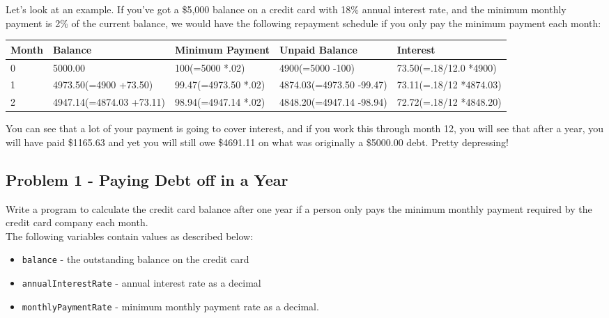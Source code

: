 \documentclass{article}
\begin{document}
Let's look at an example. If you've got a \$5,000 balance on a credit card with
18\% annual interest rate, and the minimum monthly payment is 2\% of the current
balance, we would have the following repayment schedule if you only pay the
minimum payment each month:

\begin{table}[H]
  \centering

  \begin{tabular}{ | m{1cm} | m{3cm} | m{3cm} | m{3cm} | m{3cm} | }
    \hline
    Month & Balance & Minimum Payment & Unpaid Balance & Interest \\
    \hline
    0   & 5000.00 & 100(=5000 *.02) & 4900(=5000 -100) & 73.50(=.18/12.0 *4900)\\
    \hline
    1 & 4973.50(=4900 +73.50) & 99.47(=4973.50 *.02) & 4874.03(=4973.50 -99.47) & 73.11(=.18/12 *4874.03)\\
    \hline
    2 & 4947.14(=4874.03 +73.11) & 98.94(=4947.14 *.02) & 4848.20(=4947.14 -98.94) & 72.72(=.18/12 *4848.20)\\
    \hline
  \end{tabular}

\end{table}
  You can see that a lot of your payment is going to cover interest, and if you
  work this through month 12, you will see that after a year, you will have paid
  \$1165.63 and yet you will still owe \$4691.11 on what was originally a \$5000.00
  debt. Pretty depressing!
  
  \subsection*{Problem 1 - Paying Debt off in a Year }
  Write a program to calculate the credit card balance after one year if a
  person only pays the minimum monthly payment required by the credit card
  company each month.\\
  The following variables contain values as described below:
  \begin{itemize}

    \item \verb|balance| - the outstanding balance on the credit card
    \item \verb|annualInterestRate| - annual interest rate as a decimal
    \item \verb|monthlyPaymentRate| - minimum monthly payment rate as a decimal.

    \end{itemize}
\end{document}
